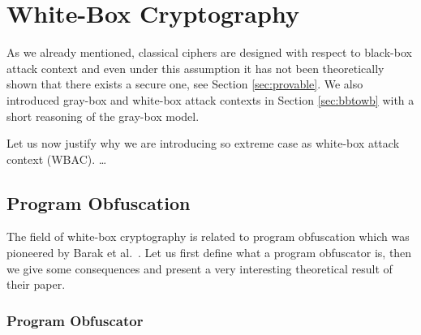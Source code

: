 
\section{White-Box Cryptography}


As we already mentioned, classical ciphers are designed with respect to black-box attack context and even under this assumption it has not been theoretically shown that there exists a secure one, see Section \ref{sec:provable}. We also introduced gray-box and white-box attack contexts in Section \ref{sec:bbtowb} with a short reasoning of the gray-box model.

Let us now justify why we are introducing so extreme case as white-box attack context (WBAC). \ldots



\subsection{Program Obfuscation}
\label{sec:impos}

The field of white-box cryptography is related to program obfuscation which was pioneered by Barak et al.\ \cite{barak2001possibility}. Let us first define what a program obfuscator is, then we give some consequences and present a very interesting theoretical result of their paper.

\subsubsection{Program Obfuscator}
	
